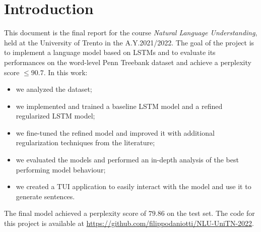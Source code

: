 \section{Introduction}
This document is the final report for the course \emph{Natural Language Understanding}, held at the University of Trento in the A.Y.2021/2022. The goal of the project is to implement a language model based on LSTMs and to evaluate its performances on the word-level Penn Treebank dataset and achieve a perplexity score $\le 90.7$. In this work:
\begin{itemize}
    \item we analyzed the dataset;
    \item we implemented and trained a baseline LSTM model and a refined regularized LSTM model;
    \item we fine-tuned the refined model and improved it with additional regularization techniques from the literature;
    \item we evaluated the models and performed an in-depth analysis of the best performing model behaviour;
    \item we created a TUI application to easily interact with the model and use it to generate sentences.
\end{itemize}
The final model achieved a perplexity score of $79.86$ on the test set. The code for this project is available at \url{https://github.com/filippodaniotti/NLU-UniTN-2022}.